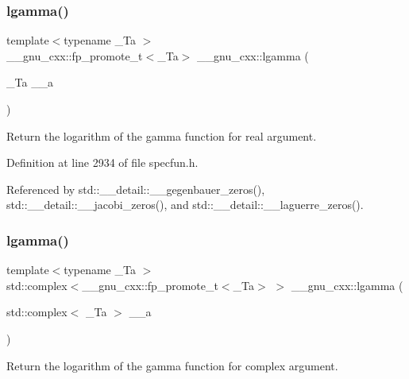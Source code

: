 \subsubsection{\texorpdfstring{lgamma()}{lgamma()}\hspace{0.1cm}{\footnotesize\ttfamily [1/2]}}
{\footnotesize\ttfamily template$<$typename \+\_\+\+Ta $>$ \\
\+\_\+\+\_\+gnu\+\_\+cxx\+::fp\+\_\+promote\+\_\+t$<$\+\_\+\+Ta$>$ \+\_\+\+\_\+gnu\+\_\+cxx\+::lgamma (\begin{DoxyParamCaption}\item[{\+\_\+\+Ta}]{\+\_\+\+\_\+a }\end{DoxyParamCaption})\hspace{0.3cm}{\ttfamily [inline]}}

Return the logarithm of the gamma function for real argument. 

Definition at line 2934 of file specfun.\+h.



Referenced by std\+::\+\_\+\+\_\+detail\+::\+\_\+\+\_\+gegenbauer\+\_\+zeros(), std\+::\+\_\+\+\_\+detail\+::\+\_\+\+\_\+jacobi\+\_\+zeros(), and std\+::\+\_\+\+\_\+detail\+::\+\_\+\+\_\+laguerre\+\_\+zeros().

\mbox{\label{group__gnu__math__spec__func_ga93530dc48fbf301835215cdffedc42d8}} 
\subsubsection{\texorpdfstring{lgamma()}{lgamma()}\hspace{0.1cm}{\footnotesize\ttfamily [2/2]}}
{\footnotesize\ttfamily template$<$typename \+\_\+\+Ta $>$ \\
std\+::complex$<$\+\_\+\+\_\+gnu\+\_\+cxx\+::fp\+\_\+promote\+\_\+t$<$\+\_\+\+Ta$>$ $>$ \+\_\+\+\_\+gnu\+\_\+cxx\+::lgamma (\begin{DoxyParamCaption}\item[{std\+::complex$<$ \+\_\+\+Ta $>$}]{\+\_\+\+\_\+a }\end{DoxyParamCaption})\hspace{0.3cm}{\ttfamily [inline]}}

Return the logarithm of the gamma function for complex argument. 

